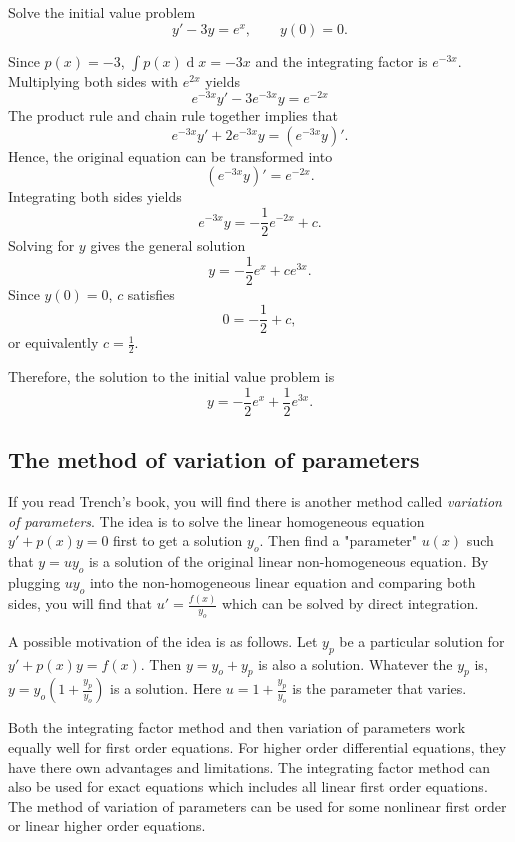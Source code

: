 \begin{exercise}
 Solve the initial value problem 
\[  y' - 3y =e^x, \qquad y(0)=0.\]
\end{exercise}
\begin{exersol}
Since $p(x)=-3$, $\int p(x)  \operatorname{d} x= -3x$ and the integrating factor is $e^{-3x}$.
Multiplying both sides with $e^{2x}$ yields
\[e^{-3x} y' - 3e^{-3x} y  =   e^{-2x}\]
The product rule and chain rule together implies that
\[e^{-3x} y'+ 2 e^{-3x} y =  (e^{-3x} y)'.\]
Hence, the original equation can be transformed into
\[( e^{-3x} y)'   = e^{-2x}.\]
Integrating both sides yields 
\[e^{-3x} y = -\frac{1}{2} e^{-2x} + c.\]
Solving for $y$ gives the general solution
\[y= -\frac{1}{2} e^x + c e^{3x}.\]
Since $y(0)=0$, $c$ satisfies
\[0=-\frac12 + c,\] 
or equivalently $c=\frac12$.

Therefore, the solution to the initial value problem is
\[y=-\frac12 e^x + \frac12 e^{3x}.\]
\end{exersol}

\subsection{The method of variation of parameters}
  If you read Trench's book, you will find there is another method called \emph{variation of parameters}. The idea is to solve the  linear homogeneous equation $y'+p(x)y=0$ first to get a solution $y_o$. Then find a "parameter" $u(x)$ such that $y=uy_o$ is a solution of the original linear non-homogeneous equation. By plugging $uy_o$ into the non-homogeneous linear equation and comparing both sides, you will find that $u'=\frac{f(x)}{y_o}$ which can be solved by direct integration.

  A possible motivation of the idea is as follows.
  Let $y_p$ be a particular solution for $y'+p(x)y=f(x)$. Then $y=y_o+y_p$ is also a solution. Whatever the $y_p$ is, $y=y_o(1+\frac{y_p}{y_o})$ is a solution. Here $u=1+\frac{y_p}{y_o}$ is the parameter that varies.

  Both the integrating factor method and then variation of parameters work equally well for first order equations. For higher order differential equations, they have there own advantages and limitations. The integrating factor method can also be used for exact equations which includes all linear first order equations. The method of variation of parameters can be used for some nonlinear first order or linear higher order equations.

